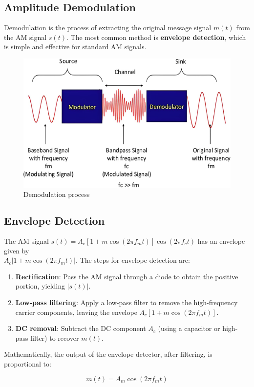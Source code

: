 \documentclass[a4paper,12pt]{article}
\begin{document}
\subsection{Amplitude Demodulation}
Demodulation is the process of extracting the original message signal \( m(t) \) from the AM signal \( s(t) \). The most common method is \textbf{envelope detection}, which is simple and effective for standard AM signals.
\begin{figure}[H]
	\centering
	\includegraphics[width=0.7\linewidth]{Images/screenshot001}
	\caption{Demodulation process}
	\label{fig:screenshot001}
\end{figure}
\subsection{Envelope Detection}
The AM signal \( s(t) = A_c \left[ 1 + m \cos(2\pi f_m t) \right] \cos(2\pi f_c t) \) has an envelope given by \\ \( A_c \left| 1 + m \cos(2\pi f_m t) \right| \). The steps for envelope detection are:

\begin{enumerate}
	\item \textbf{Rectification}: Pass the AM signal through a diode to obtain the positive portion, yielding \( |s(t)| \).
	\item \textbf{Low-pass filtering}: Apply a low-pass filter to remove the high-frequency carrier components, leaving the envelope \( A_c \left[ 1 + m \cos(2\pi f_m t) \right] \).
	\item \textbf{DC removal}: Subtract the DC component \( A_c \) (using a capacitor or high-pass filter) to recover \( m(t) \).
\end{enumerate}

Mathematically, the output of the envelope detector, after filtering, is proportional to:

\begin{equation}
	m(t) = A_m \cos(2\pi f_m t)
\end{equation}
\end{document}

